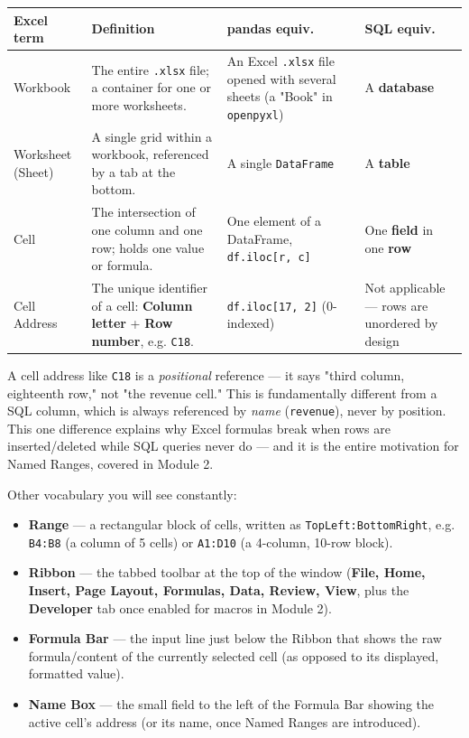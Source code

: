 \documentclass[11pt,a4paper]{article}
\begin{document}
\begin{center}
\begin{tabular}{@{}p{2.6cm}p{5.6cm}p{2.4cm}p{2.4cm}@{}}
\toprule
\textbf{Excel term} & \textbf{Definition} & \textbf{pandas equiv.} & \textbf{SQL equiv.} \\
\midrule
Workbook & The entire \texttt{.xlsx} file; a container for one or more worksheets. & An Excel \texttt{.xlsx} file opened with several sheets (a "Book" in \texttt{openpyxl}) & A \textbf{database} \\
Worksheet (Sheet) & A single grid within a workbook, referenced by a tab at the bottom. & A single \texttt{DataFrame} & A \textbf{table} \\
Cell & The intersection of one column and one row; holds one value or formula. & One element of a DataFrame, \texttt{df.iloc[r, c]} & One \textbf{field} in one \textbf{row} \\
Cell Address & The unique identifier of a cell: \textbf{Column letter} + \textbf{Row number}, e.g. \texttt{C18}. & \texttt{df.iloc[17, 2]} (0-indexed) & Not applicable --- rows are unordered by design \\
\bottomrule
\end{tabular}
\end{center}

\begin{keyconcept}
A cell address like \texttt{C18} is a \emph{positional} reference --- it says "third column, eighteenth row," not "the revenue cell." This is fundamentally different from a SQL column, which is always referenced by \emph{name} (\texttt{revenue}), never by position. This one difference explains why Excel formulas break when rows are inserted/deleted while SQL queries never do --- and it is the entire motivation for Named Ranges, covered in Module 2.
\end{keyconcept}

Other vocabulary you will see constantly:

\begin{itemize}
  \item \textbf{Range} --- a rectangular block of cells, written as \texttt{TopLeft:BottomRight}, e.g. \texttt{B4:B8} (a column of 5 cells) or \texttt{A1:D10} (a 4-column, 10-row block).
  \item \textbf{Ribbon} --- the tabbed toolbar at the top of the window (\textbf{File, Home, Insert, Page Layout, Formulas, Data, Review, View}, plus the \textbf{Developer} tab once enabled for macros in Module 2).
  \item \textbf{Formula Bar} --- the input line just below the Ribbon that shows the raw formula/content of the currently selected cell (as opposed to its displayed, formatted value).
  \item \textbf{Name Box} --- the small field to the left of the Formula Bar showing the active cell's address (or its name, once Named Ranges are introduced).
\end{itemize}
\end{document}
